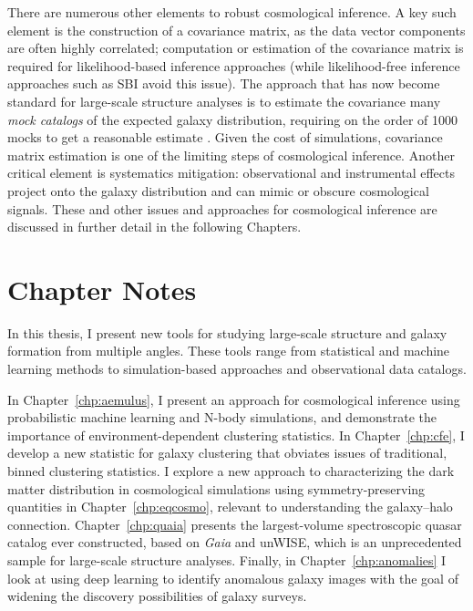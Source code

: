 There are numerous other elements to robust cosmological inference.
A key such element is the construction of a covariance matrix, as the data vector components are often highly correlated; computation or estimation of the covariance matrix is required for likelihood-based inference approaches (while likelihood-free inference approaches such as SBI avoid this issue).
The approach that has now become standard for large-scale structure analyses is to estimate the covariance many \emph{mock catalogs} of the expected galaxy distribution, requiring on the order of 1000 mocks to get a reasonable estimate \citep{Anderson2012,Kitaura2016,Beutler2017}.
Given the cost of simulations, covariance matrix estimation is one of the limiting steps of cosmological inference.
Another critical element is systematics mitigation: observational and instrumental effects project onto the galaxy distribution and can mimic or obscure cosmological signals.
These and other issues and approaches for cosmological inference are discussed in further detail in the following Chapters.


\section{Chapter Notes}

In this thesis, I present new tools for studying large-scale structure and galaxy formation from multiple angles.
These tools range from statistical and machine learning methods to simulation-based approaches and observational data catalogs.

In Chapter~\ref{chp:aemulus}, I present an approach for cosmological inference using probabilistic machine learning and N-body simulations, and demonstrate the importance of environment-dependent clustering statistics.
In Chapter~\ref{chp:cfe}, I develop a new statistic for galaxy clustering that obviates issues of traditional, binned clustering statistics.
I explore a new approach to characterizing the dark matter distribution in cosmological simulations using symmetry-preserving quantities in Chapter~\ref{chp:eqcosmo}, relevant to understanding the galaxy--halo connection.
Chapter~\ref{chp:quaia} presents the largest-volume spectroscopic quasar catalog ever constructed, based on \emph{Gaia} and unWISE, which is an unprecedented sample for large-scale structure analyses.
Finally, in Chapter~\ref{chp:anomalies} I look at using deep learning to identify anomalous galaxy images with the goal of widening the discovery possibilities of galaxy surveys.

